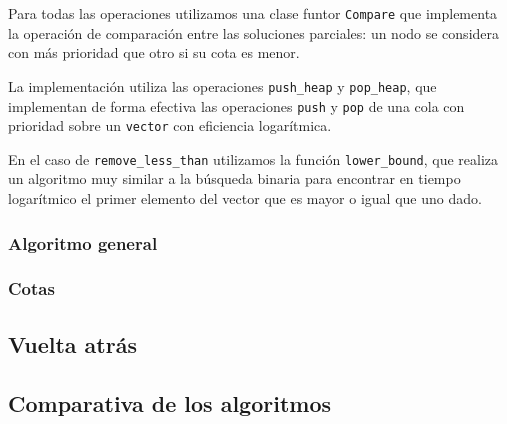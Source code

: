Para todas las operaciones utilizamos una clase funtor \texttt{Compare} que implementa
la operación de comparación entre las soluciones parciales: un nodo se considera con más prioridad que otro si su cota es menor.

La implementación utiliza las operaciones \texttt{push\_heap} y \texttt{pop\_heap}, que implementan
de forma efectiva las operaciones \texttt{push} y \texttt{pop} de una cola con prioridad sobre un \texttt{vector} con eficiencia logarítmica.

En el caso de \texttt{remove\_less\_than} utilizamos la función \texttt{lower\_bound},
que realiza un algoritmo muy similar a la búsqueda binaria para encontrar en tiempo
logarítmico el primer elemento del vector que es mayor o igual que uno dado.

\subsubsection{Algoritmo general}


\subsubsection{Cotas}


\subsection{Vuelta atrás}


\subsection{Comparativa de los algoritmos}

